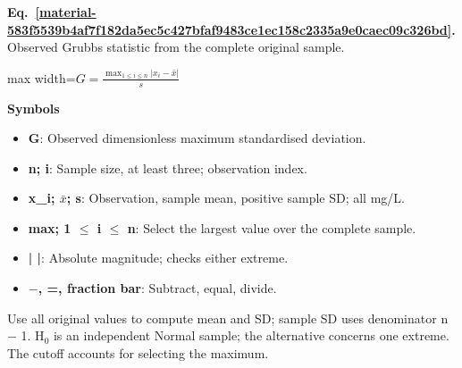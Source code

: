 \documentclass[11pt,a4paper]{article}
\begin{document}
\par\medskip
\noindent\begin{minipage}{\linewidth}
\label{material-583f5539b4af7f182da5ec5c427bfaf9483ce1ec158c2335a9e0caec09c326bd}
\noindent\textbf{Eq.~\ref*{material-583f5539b4af7f182da5ec5c427bfaf9483ce1ec158c2335a9e0caec09c326bd}.} Observed Grubbs statistic from the complete original sample.\par\nopagebreak
\begin{center}\begin{adjustbox}{max width=\linewidth}$\displaystyle G=\frac{\max_{1\le i\le n}|x_i-\bar x|}{s}$\end{adjustbox}\end{center}

\par\noindent\textbf{Symbols}

\begin{itemize}\setlength{\itemsep}{1pt}\setlength{\parsep}{0pt}
\item \textbf{G}: Observed dimensionless maximum standardised deviation.
\item \textbf{n; i}: Sample size, at least three; observation index.
\item \textbf{x\_i; \ensuremath{\bar{x}}; s}: Observation, sample mean, positive sample SD; all mg/L.
\item \textbf{max; 1 \ensuremath{\le} i \ensuremath{\le} n}: Select the largest value over the complete sample.
\item \textbf{| |}: Absolute magnitude; checks either extreme.
\item \textbf{\ensuremath{-}, =, fraction bar}: Subtract, equal, divide.
\end{itemize}

Use all original values to compute mean and SD; sample SD uses denominator n \ensuremath{-} 1. H\ensuremath{{}_0} is an independent Normal sample; the alternative concerns one extreme. The cutoff accounts for selecting the maximum.

\end{minipage}\par
\medskip
\end{document}
